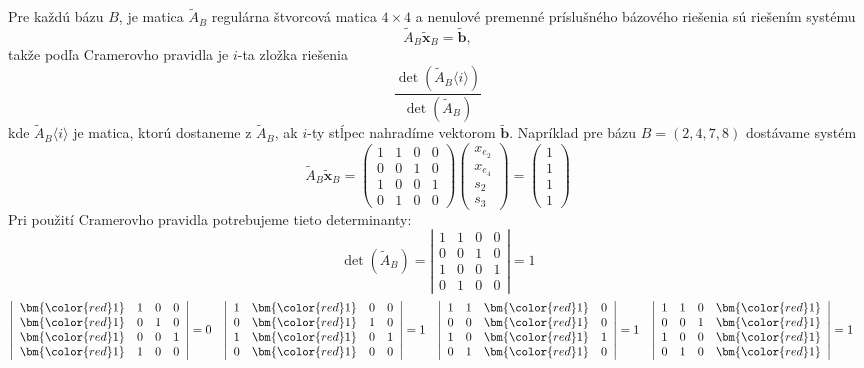 \noindent
Pre každú bázu $B$, je matica $\tilde{A}_B$ regulárna štvorcová matica $4\times 4$ a nenulové premenné príslušného bázového riešenia sú riešením
systému
$$\tilde{A}_B\bm{\tilde{x}}_B=\bm{\tilde{b}},$$
takže podľa Cramerovho pravidla je $i$-ta zložka riešenia
$$\frac{\det\left(\tilde{A}_B\langle i\rangle\right)}{\det\left(\tilde{A}_B\right)}$$
kde $\tilde{A}_B\langle i\rangle$ je matica, ktorú dostaneme z $\tilde{A}_B$, ak $i$-ty stĺpec nahradíme vektorom $\bm{\tilde{b}}$.
Napríklad pre bázu $B=(2,4,7,8)$ dostávame systém
$$\tilde{A}_B\bm{\tilde{x}}_B=\left(\begin{array}{cccc}1&1&0&0\\0&0&1&0\\1&0&0&1\\0&1&0&0\end{array}\right)
\left(\begin{array}{c}x_{e_2}\\x_{e_4}\\s_2\\s_3\end{array}\right)=
\left(\begin{array}{c}1\\1\\1\\1\end{array}\right)
$$
Pri použití Cramerovho pravidla potrebujeme tieto determinanty:
$$\det\left(\tilde{A}_B\right)=\left|\begin{array}{cccc}1&1&0&0\\0&0&1&0\\1&0&0&1\\0&1&0&0\end{array}\right|=1$$
\renewcommand{\tmp}{\bm{{\color{red}1}}}
\begin{align*}
\left|\begin{array}{cccc}\tmp&1&0&0\\\tmp&0&1&0\\\tmp&0&0&1\\\tmp&1&0&0\end{array}\right|&=0&
\left|\begin{array}{cccc}1&\tmp&0&0\\0&\tmp&1&0\\1&\tmp&0&1\\0&\tmp&0&0\end{array}\right|&=1&
\left|\begin{array}{cccc}1&1&\tmp&0\\0&0&\tmp&0\\1&0&\tmp&1\\0&1&\tmp&0\end{array}\right|&=1&
\left|\begin{array}{cccc}1&1&0&\tmp\\0&0&1&\tmp\\1&0&0&\tmp\\0&1&0&\tmp\end{array}\right|&=1
\end{align*}
